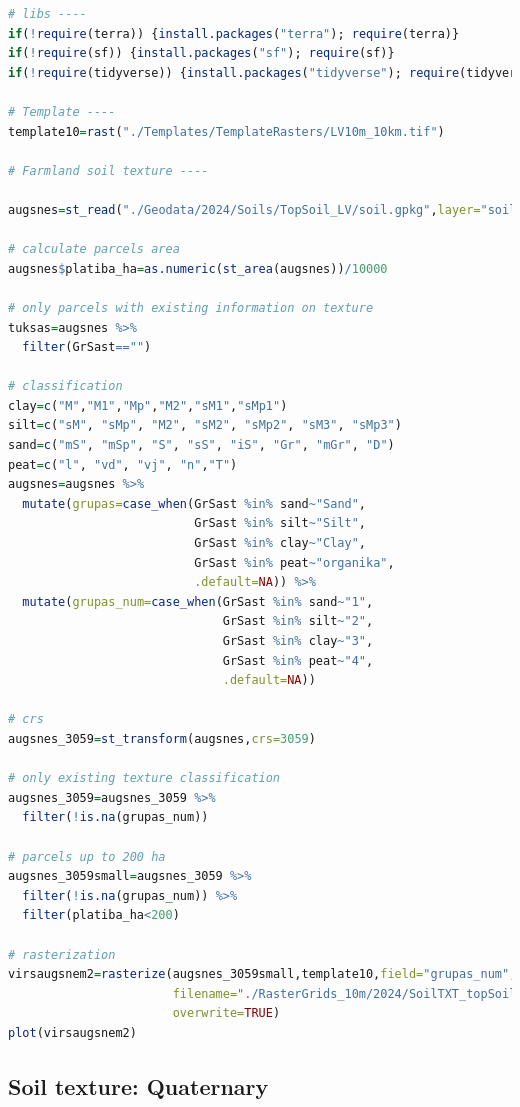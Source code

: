 \documentclass[
]{book}
\begin{document}
\begin{lstlisting}[language=R]
# libs ----
if(!require(terra)) {install.packages("terra"); require(terra)}
if(!require(sf)) {install.packages("sf"); require(sf)}
if(!require(tidyverse)) {install.packages("tidyverse"); require(tidyverse)}

# Template ----
template10=rast("./Templates/TemplateRasters/LV10m_10km.tif")

# Farmland soil texture ----

augsnes=st_read("./Geodata/2024/Soils/TopSoil_LV/soil.gpkg",layer="soilunion")

# calculate parcels area
augsnes$platiba_ha=as.numeric(st_area(augsnes))/10000

# only parcels with existing information on texture
tuksas=augsnes %>% 
  filter(GrSast=="")

# classification
clay=c("M","M1","Mp","M2","sM1","sMp1")
silt=c("sM", "sMp", "M2", "sM2", "sMp2", "sM3", "sMp3")
sand=c("mS", "mSp", "S", "sS", "iS", "Gr", "mGr", "D")
peat=c("l", "vd", "vj", "n","T")
augsnes=augsnes %>% 
  mutate(grupas=case_when(GrSast %in% sand~"Sand",
                          GrSast %in% silt~"Silt",
                          GrSast %in% clay~"Clay",
                          GrSast %in% peat~"organika",
                          .default=NA)) %>% 
  mutate(grupas_num=case_when(GrSast %in% sand~"1",
                              GrSast %in% silt~"2",
                              GrSast %in% clay~"3",
                              GrSast %in% peat~"4",
                              .default=NA))

# crs
augsnes_3059=st_transform(augsnes,crs=3059)

# only existing texture classification
augsnes_3059=augsnes_3059 %>% 
  filter(!is.na(grupas_num))

# parcels up to 200 ha
augsnes_3059small=augsnes_3059 %>% 
  filter(!is.na(grupas_num)) %>% 
  filter(platiba_ha<200)

# rasterization
virsaugsnem2=rasterize(augsnes_3059small,template10,field="grupas_num",fun="max",
                       filename="./RasterGrids_10m/2024/SoilTXT_topSoilLV.tif",
                       overwrite=TRUE)
plot(virsaugsnem2)
\end{lstlisting}

\subsection{Soil texture: Quaternary}\label{Ch04.07.04}
\end{document}
